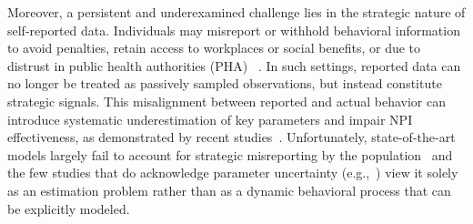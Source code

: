 \documentclass[sigconf,review]{acmart}
\begin{document}
Moreover, a persistent and underexamined challenge lies in the strategic nature of self-reported data. Individuals may misreport or withhold behavioral information to avoid penalties, retain access to workplaces or social benefits, or due to distrust in public health authorities (PHA) ~\cite{levy2022,shiman2023}.  
In such settings, reported data 
can no longer be treated as passively sampled observations, but instead constitute strategic signals.
This misalignment between reported and actual behavior can introduce systematic underestimation of key parameters and impair NPI effectiveness, as demonstrated by recent studies~\cite{WuNature2020,PullanoNature2021,MilanesiArxiv2023}. Unfortunately, state-of-the-art models largely fail to account for strategic misreporting by the population~\cite{PatelJTB2005} %
and the few studies that do acknowledge parameter uncertainty
(e.g.,~\cite{TannerMB2018}) 
view it solely as an estimation problem rather than as a dynamic behavioral process that can be explicitly modeled.

\end{document}
